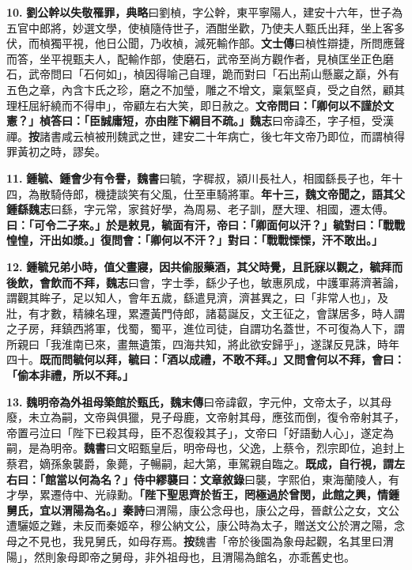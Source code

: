 \textbf{10.} \textbf{劉公幹以失敬罹罪，}{\footnotesize \textbf{典略}曰劉楨，字公幹，東平寧陽人，建安十六年，世子為五官中郎將，妙選文學，使楨隨侍世子，酒酣坐歡，乃使夫人甄氏出拜，坐上客多伏，而楨獨平視，他日公聞，乃收楨，減死輸作部。\textbf{文士傳}曰楨性辯捷，所問應聲而答，坐平視甄夫人，配輸作部，使磨石，武帝至尚方觀作者，見楨匡坐正色磨石，武帝問曰「石何如」，楨因得喻己自理，跪而對曰「石出荊山懸巖之巔，外有五色之章，內含卞氏之珍，磨之不加瑩，雕之不增文，稟氣堅貞，受之自然，顧其理枉屈紆繞而不得申」，帝顧左右大笑，即日赦之。}\textbf{文帝問曰：「卿何以不謹於文憲？」楨答曰：「臣誠庸短，亦由陛下綱目不疏。」}{\footnotesize \textbf{魏志}曰帝諱丕，字子桓，受漢禪。\textbf{按}諸書咸云楨被刑魏武之世，建安二十年病亡，後七年文帝乃即位，而謂楨得罪黃初之時，謬矣。}

\textbf{11.} \textbf{鍾毓、鍾會少有令譽，}{\footnotesize \textbf{魏書}曰毓，字穉叔，潁川長社人，相國繇長子也，年十四，為散騎侍郎，機捷談笑有父風，仕至車騎將軍。}\textbf{年十三，魏文帝聞之，語其父鍾繇}{\footnotesize \textbf{魏志}曰繇，字元常，家貧好學，為周易、老子訓，歷大理、相國，遷太傅。}\textbf{曰：「可令二子來。」於是敕見，毓面有汗，帝曰：「卿面何以汗？」毓對曰：「戰戰惶惶，汗出如漿。」復問會：「卿何以不汗？」對曰：「戰戰慄慄，汗不敢出。」}

\textbf{12.} \textbf{鍾毓兄弟小時，值父晝寢，因共偷服藥酒，其父時覺，且託寐以觀之，毓拜而後飲，會飲而不拜，}{\footnotesize \textbf{魏志}曰會，字士季，繇少子也，敏惠夙成，中護軍蔣濟著論，謂觀其眸子，足以知人，會年五歲，繇遣見濟，濟甚異之，曰「非常人也」，及壯，有才數，精練名理，累遷黃門侍郎，諸葛誕反，文王征之，會謀居多，時人謂之子房，拜鎮西將軍，伐蜀，蜀平，進位司徒，自謂功名蓋世，不可復為人下，謂所親曰「我淮南已來，畫無遺策，四海共知，將此欲安歸乎」，遂謀反見誅，時年四十。}\textbf{既而問毓何以拜，毓曰：「酒以成禮，不敢不拜。」又問會何以不拜，會曰：「偷本非禮，所以不拜。」}

\textbf{13.} \textbf{魏明帝為外祖母築館於甄氏，}{\footnotesize \textbf{魏末傳}曰帝諱叡，字元仲，文帝太子，以其母廢，未立為嗣，文帝與俱獵，見子母鹿，文帝射其母，應弦而倒，復令帝射其子，帝置弓泣曰「陛下已殺其母，臣不忍復殺其子」，文帝曰「好語動人心」，遂定為嗣，是為明帝。\textbf{魏書}曰文昭甄皇后，明帝母也，父逸，上蔡令，烈宗即位，追封上蔡君，嫡孫象襲爵，象薨，子暢嗣，起大第，車駕親自臨之。}\textbf{既成，自行視，謂左右曰：「館當以何為名？」侍中繆襲曰：}{\footnotesize \textbf{文章敘錄}曰襲，字熙伯，東海蘭陵人，有才學，累遷侍中、光祿勳。}\textbf{「陛下聖思齊於哲王，罔極過於曾閔，此館之興，情鍾舅氏，宜以渭陽為名。」}{\footnotesize \textbf{秦詩}曰渭陽，康公念母也，康公之母，晉獻公之女，文公遭驪姬之難，未反而秦姬卒，穆公納文公，康公時為太子，贈送文公於渭之陽，念母之不見也，我見舅氏，如母存焉。\textbf{按}魏書「帝於後園為象母起觀，名其里曰渭陽」，然則象母即帝之舅母，非外祖母也，且渭陽為館名，亦乖舊史也。}

